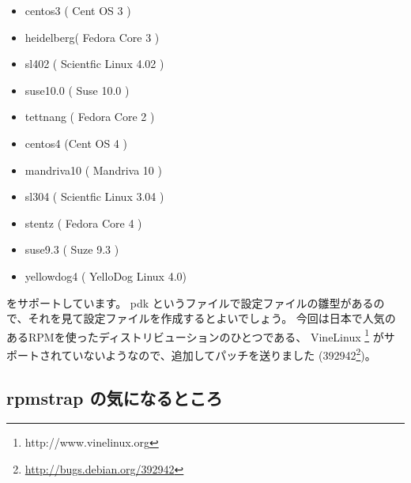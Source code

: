 \documentclass[mingoth,a4paper]{jsarticle}
\newcommand{\debianbug}[1]{#1\footnote{\url{http://bugs.debian.org/#1}}}
\begin{document}
\begin{itemize}
\item centos3 ( Cent OS 3 )
\item heidelberg( Fedora Core 3 )  
\item sl402 ( Scientfic Linux 4.02 )       
\item suse10.0  ( Suse 10.0 )
\item tettnang ( Fedora Core 2 )
\item centos4  (Cent OS 4 )   
\item mandriva10 ( Mandriva 10 )
\item sl304  ( Scientfic Linux 3.04 )    
\item stentz ( Fedora Core 4 )  
\item suse9.3  ( Suze 9.3 )   
\item yellowdog4 ( YelloDog Linux 4.0)
\end{itemize}

をサポートしています。
pdk というファイルで設定ファイルの雛型があるので、それを見て設定ファイルを作成するとよいでしょう。
今回は日本で人気のあるRPMを使ったディストリビューションのひとつである、 VineLinux \footnote{http://www.vinelinux.org} 
がサポートされていないようなので、追加してパッチを送りました (\debianbug{392942})。

\subsection{rpmstrap の気になるところ}
\end{document}
